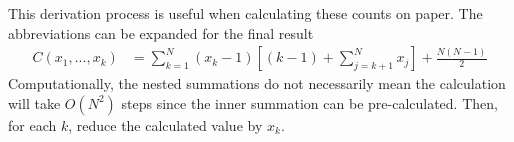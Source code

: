 \documentclass[12pt]{article}
\begin{document}
This derivation process is useful when calculating these counts on paper.
The abbreviations can be expanded for the final result
\begin{equation}
\begin{aligned}
    C(x_1,...,x_k) &= \sum_{k=1}^{N} (x_k - 1) \left[ (k-1) + \sum_{j=k+1}^{N} x_j \right] + \frac{N(N-1)}{2}
\end{aligned}
\end{equation}
Computationally, the nested summations do not necessarily mean the calculation
will take $O(N^2)$ steps since the inner summation can be pre-calculated. Then,
for each $k$, reduce the calculated value by $x_k$.
\end{document}
